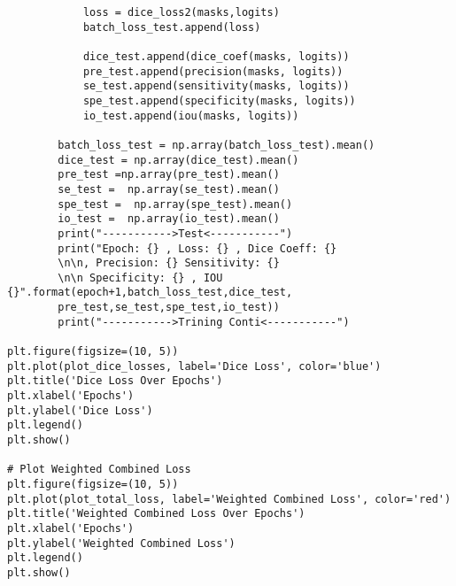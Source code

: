 \begin{verbatim}
            loss = dice_loss2(masks,logits)
            batch_loss_test.append(loss)

            dice_test.append(dice_coef(masks, logits))
            pre_test.append(precision(masks, logits))
            se_test.append(sensitivity(masks, logits))
            spe_test.append(specificity(masks, logits))
            io_test.append(iou(masks, logits))

        batch_loss_test = np.array(batch_loss_test).mean()
        dice_test = np.array(dice_test).mean()
        pre_test =np.array(pre_test).mean()
        se_test =  np.array(se_test).mean()
        spe_test =  np.array(spe_test).mean()
        io_test =  np.array(io_test).mean()
        print("----------->Test<-----------")
        print("Epoch: {} , Loss: {} , Dice Coeff: {}
        \n\n, Precision: {} Sensitivity: {} 
        \n\n Specificity: {} , IOU {}".format(epoch+1,batch_loss_test,dice_test,
        pre_test,se_test,spe_test,io_test))
        print("----------->Trining Conti<-----------")

plt.figure(figsize=(10, 5))
plt.plot(plot_dice_losses, label='Dice Loss', color='blue')
plt.title('Dice Loss Over Epochs')
plt.xlabel('Epochs')
plt.ylabel('Dice Loss')
plt.legend()
plt.show()

# Plot Weighted Combined Loss
plt.figure(figsize=(10, 5))
plt.plot(plot_total_loss, label='Weighted Combined Loss', color='red')
plt.title('Weighted Combined Loss Over Epochs')
plt.xlabel('Epochs')
plt.ylabel('Weighted Combined Loss')
plt.legend()
plt.show()


\end{verbatim}
